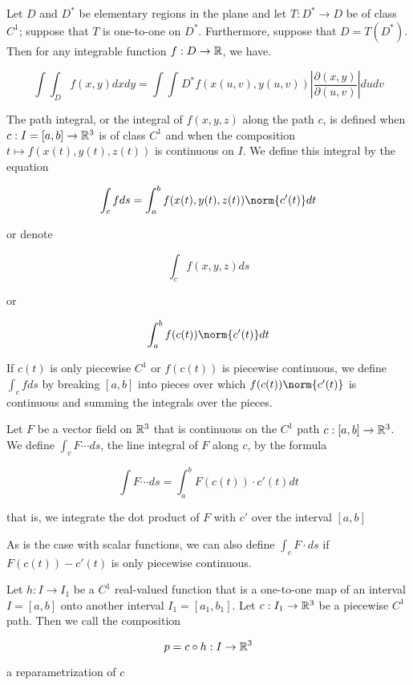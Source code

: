 \begin{thm*}
	Let $D$ and $D^*$ be elementary regions in the plane and let $T : D^* \rightarrow D$ be of class $C^1$; suppose that $T$ is one-to-one on $D^*$. Furthermore, suppose that $D = T(D^*)$. Then for any integrable function $f: D \rightarrow \mathbb{R}$, we have.
	
	$$\int\int_D f(x,y)dxdy = \int\int_{}{D^*} f(x(u,v),y(u,v)) \left|\dfrac{\partial (x,y)}{\partial (u,v)} \right|dudv$$	
\end{thm*}

\begin{defn}
	The path integral, or the integral of $f(x,y,z)$ along the path $c$, is defined when $c: I = [a,b] \rightarrow \mathbb{R}^3$ is of class $C^1$ and when the composition $t \mapsto f(x(t),y(t),z(t))$	is continuous on $I$. We define this integral by the equation
	
	$$\int_{c}fds = \int^{b}_{a}f(x(t),y(t),z(t))\norm{c'(t)}dt$$
	
	or denote
	
	$$\int_cf(x,y,z)ds$$
	
	or
	
	$$\int^{b}_{a}f(c(t))\norm{c'(t)}dt$$
	
	If $c(t)$ is only piecewise $C^1$ or $f(c(t))$ is piecewise continuous, we define $\int_c f ds$ by breaking $[a,b]$ into pieces over which $f(c(t))\norm{c'(t)}$ is continuous and summing the integrals over the pieces.
\end{defn}

\begin{defn}
	Let $F$ be a vector field on $\mathbb{R}^3$ that is continuous on the $C^1$ path $c:[a,b] \rightarrow \mathbb{R}^3$. We define $\int_c F \cdots ds$, the line integral of $F$ along $c$, by the formula
	
	$$\int F \cdots ds = \int^{b}_{a}F(c(t))\cdot c'(t)dt$$
	
	that is, we integrate the dot product of $F$ with $c'$ over the interval $[a,b]$
	
	As is the case with scalar functions, we can also define $\int_c F \cdot ds$ if $F(c(t)) - c'(t)$ is only piecewise continuous.	
\end{defn}


\begin{defn}
	Let $h: I \rightarrow I_1$ be a $C^1$ real-valued function that is a one-to-one map of an interval $I = [a,b]$ onto another interval $I_1 = [a_1,b_1]$. Let $c: I_1 \rightarrow \mathbb{R}^3$ be a piecewise $C^1$ path. Then we call the composition
	
	$$p = c \circ h: I \rightarrow \mathbb{R}^3$$
	
	a reparametrization of 	$c$
\end{defn}





	
















